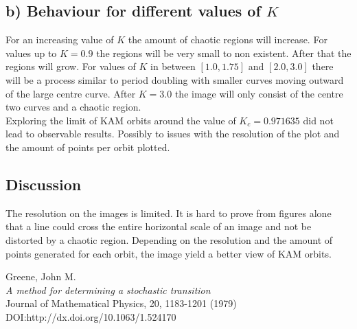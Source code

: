 \documentclass[a4paper,11pt]{article}
\begin{document}
\subsection{b) Behaviour for different values of $K$}
For an increasing value of $K$ the amount of chaotic regions will increase. For values up to $K = 0.9$ the regions will be very small to non existent. After that the regions will grow. For values of $K$ in between $[1.0,1.75]$ and $[2.0,3.0]$ there will be a process similar to period doubling with smaller curves moving outward of the large centre curve. After $K = 3.0$ the image will only consist of the centre two curves and a chaotic region.\\
Exploring the limit of KAM orbits around the value of $K_c = 0.971635$ did not lead to observable results. Possibly to issues with the resolution of the plot and the amount of points per orbit plotted.

\subsection{Discussion}
The resolution on the images is limited. It is hard to prove from figures alone that a line could cross the entire horizontal scale of an image and not be distorted by a chaotic region. Depending on the resolution and the amount of points generated for each orbit, the image yield a better view of KAM orbits.

\begin{thebibliography}{1337}
Greene, John M.\\
\emph{A method for determining a stochastic transition}\\
Journal of Mathematical Physics, 20, 1183-1201 (1979)\\ DOI:http://dx.doi.org/10.1063/1.524170

\end{thebibliography}
\end{document}
